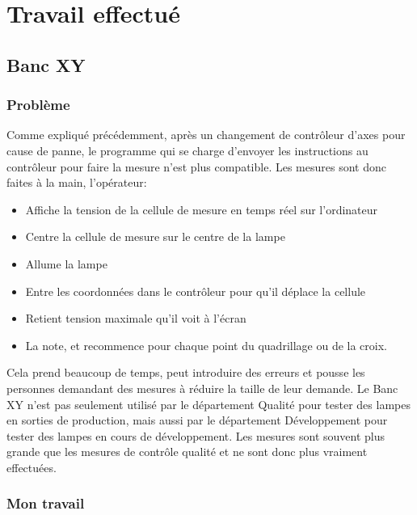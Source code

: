 \documentclass[12pt]{article}
\begin{document}
\section{Travail effectué}

\subsection{Banc XY}

\subsubsection{Problème}

Comme expliqué précédemment, après un changement de contrôleur d'axes pour cause de panne, le programme qui se charge d'envoyer les instructions au contrôleur pour faire la mesure n'est plus compatible.
Les mesures sont donc faites à la main, l'opérateur:
\begin{itemize}
		\label{etapesMesureBancXY}

	\item Affiche la tension de la cellule de mesure en temps réel sur l'ordinateur
	\item Centre la cellule de mesure sur le centre de la lampe
	\item Allume la lampe
	\item Entre les coordonnées dans le contrôleur pour qu'il déplace la cellule
	\item Retient tension maximale qu'il voit à l'écran
	\item La note, et recommence pour chaque point du quadrillage ou de la croix.
\end{itemize}
Cela prend beaucoup de temps, peut introduire des erreurs et pousse les personnes demandant des mesures à réduire la taille de leur demande.
Le Banc XY n'est pas seulement utilisé par le département Qualité pour tester des lampes en sorties de production, mais aussi par le département Développement pour tester des lampes en cours de développement.
Les mesures sont souvent plus grande que les mesures de contrôle qualité et ne sont donc plus vraiment effectuées.

\subsubsection{Mon travail}
\end{document}
